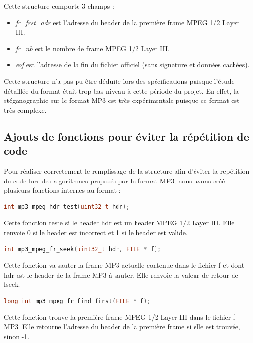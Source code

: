 \documentclass[11pt]{article}
\begin{document}
Cette structure comporte 3 champs : 
\begin{itemize}
\item \textit{fr\_frst\_adr} est l'adresse du header de la première frame 
MPEG 1/2 Layer III. 
\item \textit{fr\_nb} est le nombre de frame MPEG 1/2 Layer III.
\item \textit{eof} est l'adresse de la fin du fichier officiel (sans signature et données cachées).
\end{itemize}

Cette structure n'a pas pu être déduite lors des spécifications puisque 
l'étude détaillée du format était trop bas niveau à cette période du projet. 
En effet, la stéganographie sur le format MP3 est très expérimentale puisque 
ce format est très complexe. 

\subsection{Ajouts de fonctions pour éviter la répétition de code}

Pour réaliser correctement le remplissage de la structure afin d'éviter la
repétition de code lors des algorithmes proposés par le format MP3, 
nous avons créé plusieurs fonctions internes au format : 

\begin{lstlisting}[language=c]
int mp3_mpeg_hdr_test(uint32_t hdr);
\end{lstlisting}

Cette fonction teste si le header hdr est un header MPEG 1/2 Layer III.
Elle renvoie 0 si le header est incorrect et 1 si le header est valide. 
\newline
\begin{lstlisting}[language=c]
int mp3_mpeg_fr_seek(uint32_t hdr, FILE * f);
\end{lstlisting}

Cette fonction va sauter la frame MP3 actuelle contenue dans le fichier f
et dont hdr est le header de la frame MP3 à sauter. Elle renvoie la valeur 
de retour de fseek. 
\newline

\begin{lstlisting}[language=c]
long int mp3_mpeg_fr_find_first(FILE * f);
\end{lstlisting}

Cette fonction trouve la première frame MPEG 1/2 Layer III dans le fichier f
MP3. Elle retourne l'adresse du header de la première frame si elle est 
trouvée, sinon -1. 
\newline
\end{document}
